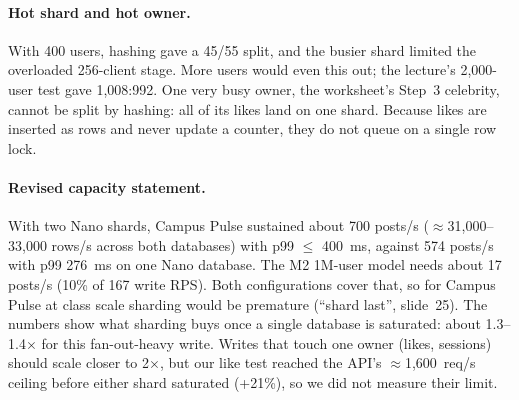 \paragraph{Hot shard and hot owner.} With 400 users, hashing gave a 45/55 split, and the busier shard limited the
overloaded 256-client stage. More users would even this out; the lecture's 2{,}000-user test gave 1{,}008:992. One
very busy owner, the worksheet's Step~3 celebrity, cannot be split by hashing: all of its likes land on one shard.
Because likes are inserted as rows and never update a counter, they do not queue on a single row lock.

\paragraph{Revised capacity statement.} With two Nano shards, Campus Pulse sustained about 700 posts/s
($\approx$31{,}000--33{,}000 rows/s across both databases) with p99 $\le$ 400~ms, against 574 posts/s with p99 276~ms on one Nano database.
The M2 1M-user model needs about 17 posts/s (10\% of 167 write RPS). Both configurations cover that, so for
Campus Pulse at class scale sharding would be premature (``shard last'', slide~25). The numbers show what sharding
buys once a single database is saturated: about 1.3--1.4$\times$ for this fan-out-heavy write. Writes that touch one
owner (likes, sessions) should scale closer to 2$\times$, but our like test reached the API's $\approx$1{,}600~req/s ceiling
before either shard saturated (+21\%), so we did not measure their limit.

